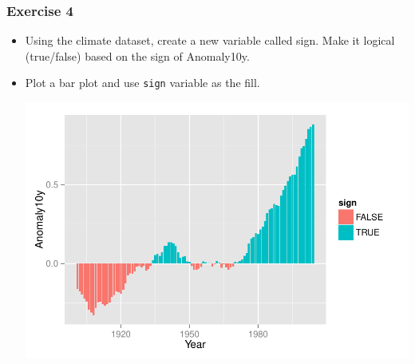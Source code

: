 \documentclass{beamer}\usepackage[]{graphicx}\usepackage[]{color}
\newenvironment{knitrout}{}{} %
\begin{document}

\begin{frame}[fragile]
\frametitle{Exercise 4}
\begin{itemize}
\item Using the climate dataset, create a new variable called sign. Make it logical (true/false) based on the sign of Anomaly10y.
\item Plot a bar plot and use \texttt{sign} variable as the fill.\\
\begin{knitrout}\footnotesize
{}\color{fgcolor}

{\centering \includegraphics[width=.75\linewidth]{figure/ex4} 

}



\end{knitrout}

\end{itemize}
\end{frame}

\end{document}
